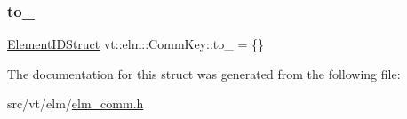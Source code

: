 \mbox{\label{structvt_1_1elm_1_1_comm_key_ac7387154a0eef34bf4af0c4c5a42c38f}} 
\subsubsection{\texorpdfstring{to\+\_\+}{to\_}}
{\footnotesize\ttfamily \hyperlink{structvt_1_1elm_1_1_element_i_d_struct}{Element\+I\+D\+Struct} vt\+::elm\+::\+Comm\+Key\+::to\+\_\+ = \{\}}



The documentation for this struct was generated from the following file\+:\begin{DoxyCompactItemize}
\item 
src/vt/elm/\hyperlink{elm__comm_8h}{elm\+\_\+comm.\+h}\end{DoxyCompactItemize}
